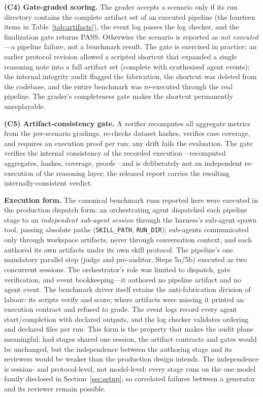 \documentclass[preprint,10pt]{elsarticle}
\begin{document}
\textbf{(C4) Gate-graded scoring.} The grader accepts a scenario only if its run directory contains the complete artifact set of an executed pipeline (the fourteen items in Table~\ref{tab:artifacts}), the event log passes the log checker, and the finalization gate returns PASS. Otherwise the scenario is reported as \emph{not executed}---a pipeline failure, not a benchmark result. The gate is exercised in practice: an earlier protocol revision allowed a scripted shortcut that expanded a single reasoning note into a full artifact set (complete with synthesised agent events); the internal integrity audit flagged the fabrication, the shortcut was deleted from the codebase, and the entire benchmark was re-executed through the real pipeline. The grader's completeness gate makes the shortcut permanently unreplayable.

\textbf{(C5) Artifact-consistency gate.} A verifier recomputes all aggregate metrics from the per-scenario gradings, re-checks dataset hashes, verifies case coverage, and requires an execution proof per run; any drift fails the evaluation. The gate verifies the internal consistency of the recorded execution---recomputed aggregates, hashes, coverage, proofs---and is deliberately not an independent re-execution of the reasoning layer; the released report carries the resulting internally-consistent verdict.

\textbf{Execution form.} The canonical benchmark runs reported here were executed in the production dispatch form: an orchestrating agent dispatched each pipeline stage to an \emph{independent sub-agent session} through the harness's sub-agent spawn tool, passing absolute paths (\texttt{SKILL\_PATH}, \texttt{RUN\_DIR}); sub-agents communicated only through workspace artifacts, never through conversation context, and each authored its own artifacts under its own skill protocol. The pipeline's one mandatory parallel step (judge and pre-auditor, Steps 5a/5b) executed as two concurrent sessions. The orchestrator's role was limited to dispatch, gate verification, and event bookkeeping---it authored no pipeline artifact and no agent event. The benchmark driver itself retains the anti-fabrication division of labour: its scripts verify and score; where artifacts were missing it printed an execution contract and refused to grade. The event logs record every agent start/completion with declared outputs, and the log checker validates ordering and declared files per run. This form is the property that makes the audit plane meaningful: had stages shared one session, the artifact contracts and gates would be unchanged, but the independence between the authoring stage and its reviewers would be weaker than the production design intends. The independence is session- and protocol-level, not model-level: every stage runs on the one model family disclosed in Section~\ref{sec:setup}, so correlated failures between a generator and its reviewer remain possible.
\end{document}
